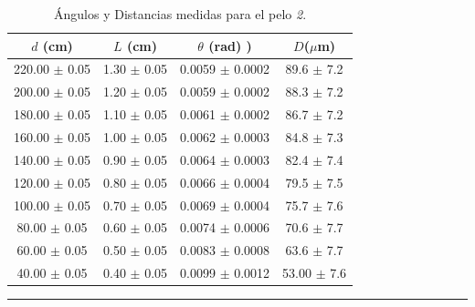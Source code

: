 \documentclass[10pt,a4paper]{article}
\begin{document}
	\begin{table}[H]
		\centering
		\begin{tabular}{|c|c|c|c|}
			\hline
			$d$ (cm) & $L$ (cm) & $\theta$ (rad) )&  $D$($\mu$m) \\ \hline
			220.00 $\pm$ 0.05  & 1.30 $\pm$ 0.05 &  0.0059 $\pm$ 0.0002  & 89.6 $\pm$ 7.2\\
			200.00 $\pm$ 0.05  & 1.20 $\pm$ 0.05 &  0.0059 $\pm$ 0.0002  & 88.3 $\pm$ 7.2 \\
			180.00 $\pm$ 0.05  & 1.10 $\pm$ 0.05 &  0.0061 $\pm$ 0.0002 & 86.7 $\pm$ 7.2\\
			160.00 $\pm$ 0.05  & 1.00 $\pm$ 0.05 &  0.0062 $\pm$ 0.0003 & 84.8 $\pm$ 7.3 \\ 
			140.00 $\pm$ 0.05 & 0.90 $\pm$ 0.05 & 0.0064 $\pm$ 0.0003 & 82.4 $\pm$ 7.4\\ 
			120.00 $\pm$ 0.05 & 0.80 $\pm$ 0.05 & 0.0066 $\pm$ 0.0004 &  79.5 $\pm$ 7.5\\ 
			100.00 $\pm$ 0.05 & 0.70 $\pm$ 0.05 & 0.0069 $\pm$ 0.0004 & 75.7 $\pm$ 7.6\\
			80.00 $\pm$ 0.05  & 0.60 $\pm$ 0.05 &  0.0074 $\pm$ 0.0006 & 70.6 $\pm$ 7.7 \\ 
			60.00 $\pm$ 0.05 & 0.50 $\pm$ 0.05 &  0.0083 $\pm$ 0.0008 & 63.6 $\pm$ 7.7 \\
			40.00 $\pm$ 0.05 & 0.40 $\pm$ 0.05 &  0.0099 $\pm$ 0.0012 & 53.00 $\pm$ 7.6  \\ \hline
			
		\end{tabular}
		\caption{Ángulos y Distancias medidas para el pelo \textit{2}.}
		\label{tab:angulos_distancias 2.}
		\rule{100mm}{0.1mm}
	\end{table}
	
\end{document}
